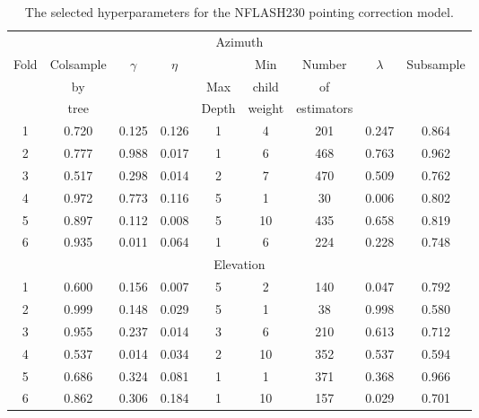 \begin{table}[!htbp]
    \centering
    \caption{The selected hyperparameters for the NFLASH230 pointing correction model.}
    \begin{tabular}{ccccccccc}
        \toprule
        \multicolumn{9}{c}{Azimuth} \\
        \cmidrule{1-9}
        \multirow{3}{*}{Fold} &  Colsample &  \multirow{3}{*}{$\gamma$} &  \multirow{3}{*}{$\eta$} &   &  Min &  Number &  \multirow{3}{*}{$\lambda$} &  \multirow{3}{*}{Subsample} \\
        & by   & & & Max   & child  & of         & & \\
        & tree & & & Depth & weight & estimators & & \\
        \midrule
        1 &      0.720 &  0.125 &          0.126 &      1 &             4 &       201 &       0.247 &      0.864 \\
        2 &      0.777 &  0.988 &          0.017 &      1 &             6 &       468 &       0.763 &      0.962 \\
        3 &      0.517 &  0.298 &          0.014 &      2 &             7 &       470 &       0.509 &      0.762 \\
        4 &      0.972 &  0.773 &          0.116 &      5 &             1 &        30 &       0.006 &      0.802 \\
        5 &      0.897 &  0.112 &          0.008 &      5 &            10 &       435 &       0.658 &      0.819 \\
        6 &      0.935 &  0.011 &          0.064 &      1 &             6 &       224 &       0.228 &      0.748 \\
        \cmidrule{1-9}
        \multicolumn{9}{c}{Elevation} \\
        \cmidrule{1-9}
        1 &      0.600 &  0.156 &          0.007 &      5 &             2 &       140 &       0.047 &      0.792 \\
        2 &      0.999 &  0.148 &          0.029 &      5 &             1 &        38 &       0.998 &      0.580 \\
        3 &      0.955 &  0.237 &          0.014 &      3 &             6 &       210 &       0.613 &      0.712 \\
        4 &      0.537 &  0.014 &          0.034 &      2 &            10 &       352 &       0.537 &      0.594 \\
        5 &      0.686 &  0.324 &          0.081 &      1 &             1 &       371 &       0.368 &      0.966 \\
        6 &      0.862 &  0.306 &          0.184 &      1 &            10 &       157 &       0.029 &      0.701 \\
        \bottomrule
        \end{tabular}
\end{table}



